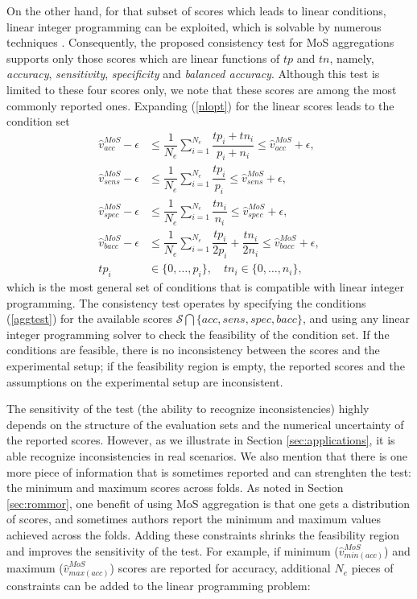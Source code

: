 \documentclass[5p, final]{elsarticle}
\begin{document}
On the other hand, for that subset of scores which leads to linear conditions, linear integer programming can be exploited, which is solvable by numerous techniques \cite{ip}. Consequently, the proposed consistency test for MoS aggregations supports only those scores which are linear functions of $tp$ and $tn$, namely, \emph{accuracy}, \emph{sensitivity}, \emph{specificity} and \emph{balanced accuracy}. Although this test is limited to these four scores only, we note that these scores are among the most commonly reported ones. 
Expanding (\ref{nlopt}) for the linear scores leads to the condition set
\begin{align}
\label{aggtest}
\hat{v}_{acc}^{MoS} - \epsilon & \leq \dfrac{1}{N_e} \sum\limits_{i=1}^{N_e} \dfrac{tp_i + tn_i}{p_i + n_i} \leq \hat{v}_{acc}^{MoS} + \epsilon, \nonumber \\
\hat{v}_{sens}^{MoS} - \epsilon & \leq \dfrac{1}{N_e} \sum\limits_{i=1}^{N_e} \dfrac{tp_i}{p_i} \leq \hat{v}_{sens}^{MoS} + \epsilon, \nonumber \\
\hat{v}_{spec}^{MoS} - \epsilon & \leq \dfrac{1}{N_e} \sum\limits_{i=1}^{N_e} \dfrac{tn_i}{n_i} \leq \hat{v}_{spec}^{MoS} + \epsilon, \nonumber \\
\hat{v}_{bacc}^{MoS} - \epsilon & \leq \dfrac{1}{N_e} \sum\limits_{i=1}^{N_e} \dfrac{tp_i}{2p_i} + \dfrac{tn_i}{2n_i} \leq \hat{v}_{bacc}^{MoS} + \epsilon, \nonumber \\
tp_i &\in \lbrace 0, \dots, p_i\rbrace, \quad tn_i \in \lbrace 0, \dots, n_i\rbrace,
\end{align}
which is the most general set of conditions that is compatible with linear integer programming. The consistency test operates by specifying the conditions (\ref{aggtest}) for the available scores $\mathcal{S} \bigcap \lbrace acc, sens, spec, bacc\rbrace$, and using any linear integer programming solver to check the feasibility of the condition set. If the conditions are feasible, there is no inconsistency between the scores and the experimental setup; if the feasibility region is empty, the reported scores and the assumptions on the experimental setup are inconsistent.

The sensitivity of the test (the ability to recognize inconsistencies) highly depends on the structure of the evaluation sets and the numerical uncertainty of the reported scores. However, as we illustrate in Section \ref{sec:applications}, it is able recognize inconsistencies in real scenarios. We also mention that there is one more piece of information that is sometimes reported and can strenghten the test: the minimum and maximum scores across folds. As noted in Section \ref{sec:rommor}, one benefit of using MoS aggregation is that one gets a distribution of scores, and sometimes authors report the minimum and maximum values achieved across the folds. Adding these constraints shrinks the feasibility region and improves the sensitivity of the test. For example, if minimum ($\hat{v}_{min(acc)}^{MoS}$)  and maximum ($\hat{v}_{max(acc)}^{MoS}$) scores are reported for accuracy, additional $N_e$ pieces of constraints can be added to the linear programming problem:
\end{document}
